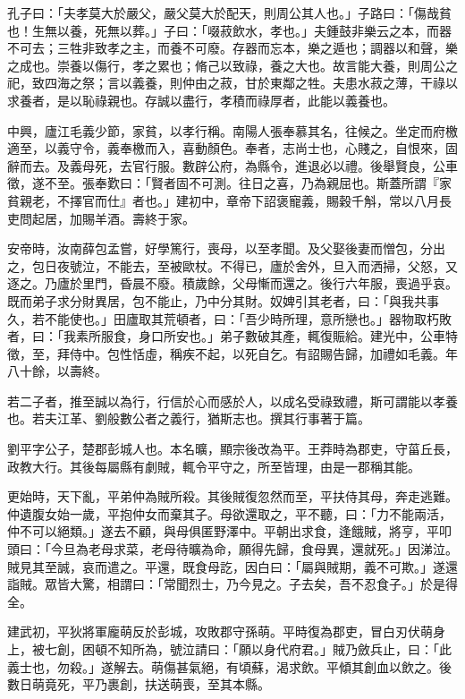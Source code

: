 
\begin{pinyinscope}
孔子曰：「夫孝莫大於嚴父，嚴父莫大於配天，則周公其人也。」子路曰：「傷哉貧也！生無以養，死無以葬。」子曰：「啜菽飲水，孝也。」夫鍾鼓非樂云之本，而器不可去；三牲非致孝之主，而養不可廢。存器而忘本，樂之遁也；調器以和聲，樂之成也。崇養以傷行，孝之累也；脩己以致祿，養之大也。故言能大養，則周公之祀，致四海之祭；言以義養，則仲由之菽，甘於東鄰之牲。夫患水菽之薄，干祿以求養者，是以恥祿親也。存誠以盡行，孝積而祿厚者，此能以義養也。

中興，廬江毛義少節，家貧，以孝行稱。南陽人張奉慕其名，往候之。坐定而府檄適至，以義守令，義奉檄而入，喜動顏色。奉者，志尚士也，心賤之，自恨來，固辭而去。及義母死，去官行服。數辟公府，為縣令，進退必以禮。後舉賢良，公車徵，遂不至。張奉歎曰：「賢者固不可測。往日之喜，乃為親屈也。斯蓋所謂『家貧親老，不擇官而仕』者也。」建初中，章帝下詔褒寵義，賜穀千斛，常以八月長吏問起居，加賜羊酒。壽終于家。

安帝時，汝南薛包孟嘗，好學篤行，喪母，以至孝聞。及父娶後妻而憎包，分出之，包日夜號泣，不能去，至被歐杖。不得已，廬於舍外，旦入而洒掃，父怒，又逐之。乃廬於里門，昏晨不廢。積歲餘，父母慚而還之。後行六年服，喪過乎哀。既而弟子求分財異居，包不能止，乃中分其財。奴婢引其老者，曰：「與我共事久，若不能使也。」田廬取其荒頓者，曰：「吾少時所理，意所戀也。」器物取朽敗者，曰：「我素所服食，身口所安也。」弟子數破其產，輒復賑給。建光中，公車特徵，至，拜侍中。包性恬虛，稱疾不起，以死自乞。有詔賜告歸，加禮如毛義。年八十餘，以壽終。

若二子者，推至誠以為行，行信於心而感於人，以成名受祿致禮，斯可謂能以孝養也。若夫江革、劉般數公者之義行，猶斯志也。撰其行事著于篇。

劉平字公子，楚郡彭城人也。本名曠，顯宗後改為平。王莽時為郡吏，守菑丘長，政教大行。其後每屬縣有劇賊，輒令平守之，所至皆理，由是一郡稱其能。

更始時，天下亂，平弟仲為賊所殺。其後賊復忽然而至，平扶侍其母，奔走逃難。仲遺腹女始一歲，平抱仲女而棄其子。母欲還取之，平不聽，曰：「力不能兩活，仲不可以絕類。」遂去不顧，與母俱匿野澤中。平朝出求食，逢餓賊，將亨，平叩頭曰：「今旦為老母求菜，老母待曠為命，願得先歸，食母異，還就死。」因涕泣。賊見其至誠，哀而遣之。平還，既食母訖，因白曰：「屬與賊期，義不可欺。」遂還詣賊。眾皆大驚，相謂曰：「常聞烈士，乃今見之。子去矣，吾不忍食子。」於是得全。

建武初，平狄將軍龐萌反於彭城，攻敗郡守孫萌。平時復為郡吏，冒白刃伏萌身上，被七創，困頓不知所為，號泣請曰：「願以身代府君。」賊乃斂兵止，曰：「此義士也，勿殺。」遂解去。萌傷甚氣絕，有頃蘇，渴求飲。平傾其創血以飲之。後數日萌竟死，平乃裹創，扶送萌喪，至其本縣。


\end{pinyinscope}
